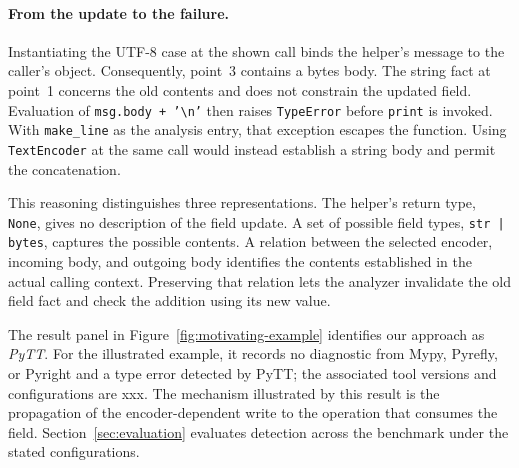 \paragraph{From the update to the failure.}
Instantiating the UTF-8 case at the shown call binds the helper's message
to the caller's object. Consequently, point~3 contains a bytes body.
The string fact at point~1 concerns the old contents and does not constrain
the updated field. Evaluation of \texttt{msg.body + '\textbackslash n'}
then raises \texttt{TypeError} before \texttt{print} is invoked. With
\texttt{make\_line} as the analysis entry, that exception escapes the
function. Using \texttt{TextEncoder} at the same call would instead
establish a string body and permit the concatenation.

This reasoning distinguishes three representations. The helper's return
type, \texttt{None}, gives no description of the field update. A set of
possible field types, \texttt{str | bytes}, captures the possible contents.
A relation between the selected encoder, incoming body, and outgoing body
identifies the contents established in the actual calling context.
Preserving that relation lets the analyzer invalidate the old field fact
and check the addition using its new value.

The result panel in Figure~\ref{fig:motivating-example} identifies our
approach as \emph{PyTT}. For the illustrated example, it records no
diagnostic from Mypy, Pyrefly, or Pyright and a type error detected by PyTT;
the associated tool versions and configurations are xxx. The mechanism
illustrated by this result is the propagation of the encoder-dependent
write to the operation that consumes the field. Section~\ref{sec:evaluation}
evaluates detection across the benchmark under the stated configurations.
